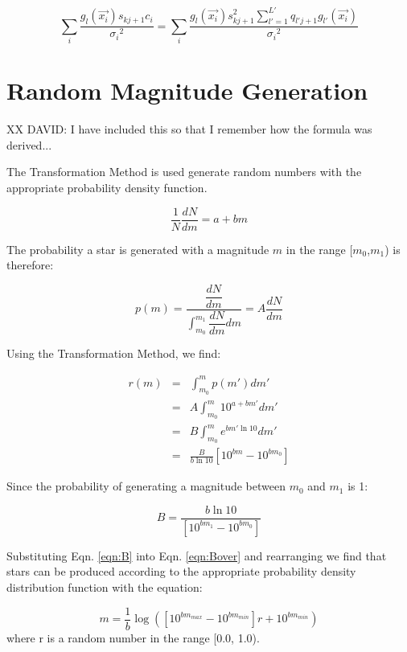 \documentclass[12pt,a4paper,twoside]{article}
\begin{document}
\begin{equation}
\sum_{i} \frac{g_l(\vec{x_i}) s_{kj+1} c_i}{{\sigma_i}^2} = \sum_{i} \frac{g_l(\vec{x_i}) s_{kj+1}^2 \sum_{l' = 1}^{L'} q_{l'j+1} g_{l'}(\vec{x_i})}{{\sigma_i}^2}
\end{equation}

\appendix
\section{Random Magnitude Generation}
XX DAVID: I have included this so that I remember how the formula was derived...


\noindent{}The Transformation Method is used generate random numbers with the appropriate probability density function. 

\begin{equation}
\frac{1}{N} \frac{dN}{dm} = a + b m
\end{equation}

\noindent{}The probability a star is generated with a magnitude $m$ in the range [$m_0$,$m_1$) is therefore:

\begin{equation}
p(m) = \frac{\dfrac{d N}{d m}}{\int_{m_{0}}^{m_{1}}\dfrac{d N}{d m} dm} = A \frac{d N}{d m}
\end{equation}

\noindent{}Using the Transformation Method, we find:

\begin{eqnarray}
r (m) & = & \int_{m_{0}}^{m} p(m') dm'\\
& = & A \int_{m_{0}}^{m} 10^{a+b m'} dm'\\
& = & B \int_{m_{0}}^{m} e^{b m' \ln{10}} dm'\\
& = & \frac{B}{b \ln{10}} \left[ 10^{b m} - 10^{b m_{0}} \right] \label{eqn:Bover}
\end{eqnarray}

\noindent{}Since the probability of generating a magnitude between $m_0$ and $m_1$ is 1:

\begin{equation}
B = \frac{b \ln{10}}{\left[ 10^{b m_{1}} - 10^{b m_{0}} \right]} \label{eqn:B}
\end{equation}

\noindent{}Substituting Eqn. \ref{eqn:B} into Eqn. \ref{eqn:Bover} and rearranging we find that stars can be produced according to the appropriate probability density distribution function with the equation:

\begin{equation}
m = \frac{1}{b} \log{(\left[ 10^{b m_{max}} - 10^{b m_{min}} \right] r + 10^{b m_{min}})}
\end{equation}
\noindent{}where r is a random number in the range [0.0, 1.0).
\end{document}
